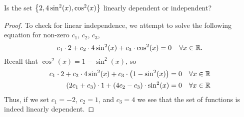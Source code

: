 \documentclass{tutorial}
\begin{document}
\begin{prob}
Is the set $\left\{ 2,4 \sin^2(x),\cos^2(x) \right\}$ linearly dependent or independent?
\end{prob} \ifsolns \begin{proof}
To check for linear independence, we attempt to solve the following equation for non-zero $c_1$, $c_2$, $c_3$,
\[
  c_1 \cdot 2 + c_2 \cdot 4\sin^2(x) + c_3 \cdot \cos^2(x) = 0 \hspace{0.15in} \forall x \in \mathbb{R} .
\]
Recall that $\cos^2(x) = 1 -\sin^2(x)$, so
\begin{align*}
  c_1 \cdot 2 + c_2 \cdot 4\sin^2(x) + c_3 \cdot \left( 1-\sin^2(x) \right) & = 0 & \forall x \in \mathbb{R} \\
  \left( 2c_1 + c_3 \right) \cdot 1 + \left( 4c_2 - c_3 \right) \cdot \sin^2(x) & = 0 & \forall x \in \mathbb{R}
\end{align*}
Thus, if we set $c_1 = -2$, $c_2 = 1$, and $c_3 = 4$ we see that the set of functions is indeed linearly dependent. 
\end{proof}\else \vspace{3in} \fi
\end{document}
